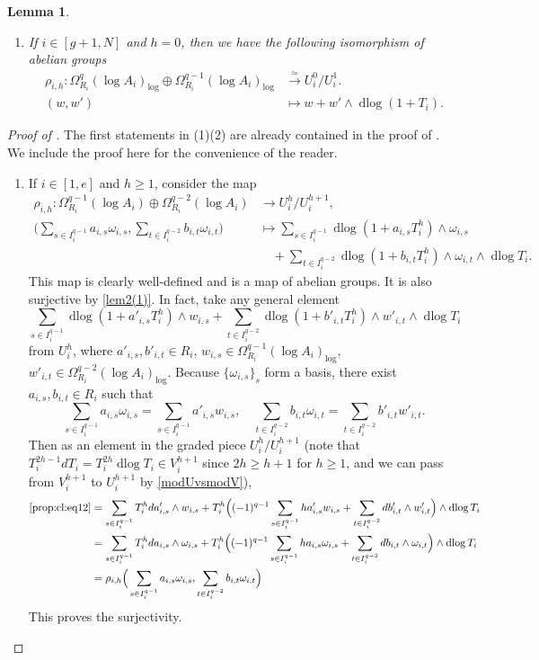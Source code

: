 \documentclass[11pt]{amsart}
\newcommand{\eq}[2]{\begin{equation}\label{#1}#2 \end{equation}}
\newcommand{\ra}{\rightarrow}
\newcommand{\xra}{\xrightarrow}
\newcommand{\dlog}{\operatorname{dlog}}
\theoremstyle{plain}
\newtheorem{lem}[prop]{Lemma}
\theoremstyle{definition}
\numberwithin{equation}{prop}
\begin{document}
\begin{lem}
\begin{enumerate}
\item \label{lem3(7}
If $i\in [g+1,N]$ and $h=0$, then we have the following isomorphism of abelian groups
\begin{align*}
\rho_{i,h}:
\Omega^q_{R_i}(\log A_i)_{\log}
\oplus \Omega^{q-1}_{R_i}(\log A_i)_{\log}
&\xra{\simeq}
U_i^{0}/U_i^{1}.
\\
(w,w')
&\mapsto w
+ w'\wedge\dlog(1+T_i).
\end{align*}
\end{enumerate}
\end{lem}
\begin{proof}[Proof of ]
The first statements in (1)(2) are already contained in the proof of \cite[p. 224, Lemma 4]{Kato82}. We include the proof here for the convenience of the reader.
\begin{enumerate}[label= (\alph*)]
\item 
If $i\in [1,e]$ and $h\ge 1$, 
consider the map
\begin{align} 
\label{prop:cl:eq1}
\rho_{i,h}:
\Omega^{q-1}_{R_i}(\log A_i)\oplus \Omega^{q-2}_{R_i}(\log A_i)
&\ra
U_i^{h}/U_i^{h+1},
\\
\Big(
\sum_{s\in I_i^{q-1}}a_{i,s}\omega_{i,s},
\sum_{t\in I_i^{q-2}}b_{i,t}\omega_{i,t}
\Big)
&\mapsto
\sum_{s\in I_i^{q-1}} \dlog(1+a_{i,s}T_i^{h})\wedge\omega_{i,s}
\nonumber
\\
&\quad 
+\sum_{t\in I_i^{q-2}}
\dlog(1+b_{i,t}T_i^{h})\wedge\omega_{i,t}\wedge \dlog T_i.
\nonumber
\end{align}
This map is clearly well-defined and is a map of abelian groups.
It is also surjective by \eqref{lem2(1)}.
In fact, take any general element 
\eq{prop:cl:eq12}{\sum_{s\in I_i^{q-1}} 
\dlog(1+a'_{i,s}T_i^{h})\wedge w_{i,s}
+\sum_{t\in I_i^{q-2}}
\dlog(1+b'_{i,t}T_i^{h})\wedge w'_{i,t}\wedge \dlog T_i
}
from $U_i^h$, where
$a'_{i,s},b'_{i,t}\in R_i$, 
$w_{i,s}\in \Omega^{q-1}_{R_i}(\log A_i)_{\log}$, $w'_{i,t}\in \Omega^{q-2}_{R_i}(\log A_i)_{\log}$.
Because $\{\omega_{i,s}\}_s$ form a basis, there exist
$a_{i,s}, b_{i,t}\in R_i$ such that
$$\sum_{s\in I_i^{q-1}} a_{i,s}\omega_{i,s}
=\sum_{s\in I_i^{q-1}} a'_{i,s} w_{i,s},
\quad 
\sum_{t\in I_i^{q-2}} b_{i,t}\omega_{i,t}
=\sum_{t\in I_i^{q-2}} b'_{i,t}  w'_{i,t}.$$
Then as an element in the graded piece $U_i^h/U_i^{h+1}$ (note that $T_i^{2h-1}dT_i = T_i^{2h}\dlog T_i \in V_i^{h+1}$ since $2h \ge h+1$ for $h\ge 1$, and we can pass from $V_i^{h+1}$ to $U_i^{h+1}$ by \eqref{modUvsmodV}),
\begin{align*} 
\eqref{prop:cl:eq12}
&=
\sum_{s\in I_i^{q-1}} 
T_i^{h}da'_{i,s}\wedge w_{i,s}
+
T_i^{h}\Big(
(-1)^{q-1}\sum_{s\in I_i^{q-1}} h a'_{i,s}w_{i,s}+
\sum_{t\in I_i^{q-2}}db'_{i,t}\wedge w'_{i,t}\Big)\wedge \dlog T_i
\\
&=\sum_{s\in I_i^{q-1}} 
T_i^{h}da_{i,s}\wedge \omega_{i,s}
+
T_i^{h}\Big(
(-1)^{q-1}\sum_{s\in I_i^{q-1}} h a_{i,s} \omega_{i,s}+
\sum_{t\in I_i^{q-2}}db_{i,t}\wedge \omega_{i,t}\Big)\wedge \dlog T_i
\\
&=
\rho_{i,h}\Big(
\sum_{s\in I_i^{q-1}}a_{i,s}\omega_{i,s},
\sum_{t\in I_i^{q-2}}b_{i,t}\omega_{i,t}
\Big)
\end{align*}
This proves the surjectivity.


\end{enumerate}
\end{proof}
\end{document}
